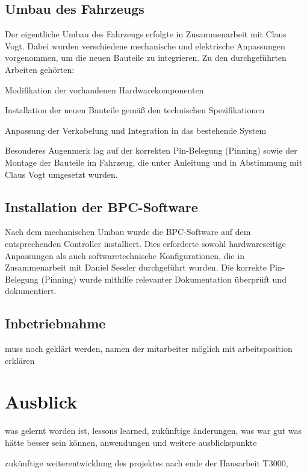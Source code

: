 \documentclass[a4paper, 12pt]{article} %
\begin{document}
\begin{spacing}{1.5}
 \subsection{Umbau des Fahrzeugs}
 Der eigentliche Umbau des Fahrzeugs erfolgte in Zusammenarbeit mit Claus Vogt. Dabei wurden verschiedene
 mechanische und elektrische Anpassungen vorgenommen, um die neuen Bauteile zu integrieren. 
 Zu den durchgeführten Arbeiten gehörten:
 
 Modifikation der vorhandenen Hardwarekomponenten

 Installation der neuen Bauteile gemäß den technischen Spezifikationen

 Anpassung der Verkabelung und Integration in das bestehende System

 Besonderes Augenmerk lag auf der korrekten Pin-Belegung (Pinning) sowie der Montage der Bauteile im Fahrzeug, die unter Anleitung und in Abstimmung mit Claus Vogt umgesetzt wurden.

 \subsection{Installation der BPC-Software}
Nach dem mechanischen Umbau wurde die \acs{BPC}-Software auf 
dem entsprechenden Controller installiert. Dies erforderte sowohl hardwareseitige Anpassungen
 als auch softwaretechnische Konfigurationen, die in Zusammenarbeit mit Daniel Sessler durchgeführt wurden. 
 Die korrekte Pin-Belegung (Pinning) wurde mithilfe relevanter Dokumentation überprüft und dokumentiert.

\subsection{Inbetriebnahme}
muss noch geklärt werden, namen der mitarbeiter möglich mit arbeitsposition erklären

\end{spacing}
\section{Ausblick}

was gelernt worden ist, lessons learned, zukünftige änderungen, was war gut was hätte besser sein können,  anwendungen und weitere ausblickspunkte

zukünftige weiterentwicklung des projektes nach ende der Hausarbeit T3000, 
\clearpage

\begingroup
\renewcommand{\bibfont}{\fontsize{13pt}{12pt}\selectfont}  
\sloppy
\nocite{*}
\printbibliography
\end{document}
